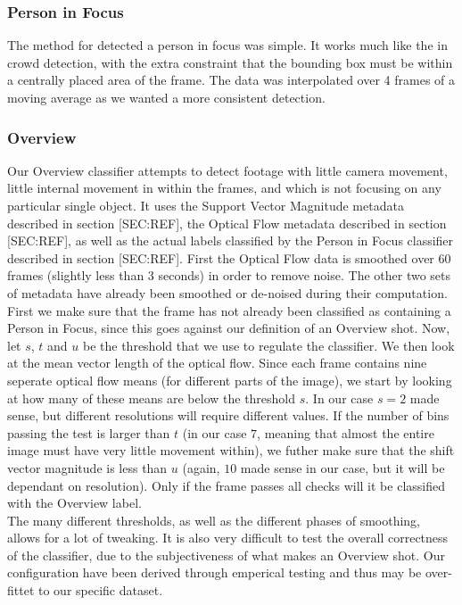 \subsubsection{Person in Focus}
%
The method for detected a person in focus was simple. It works much like the in crowd detection, with the extra constraint that the bounding box must be within a centrally placed area of the frame. The data was interpolated over 4 frames of a moving average as we wanted a more consistent detection.
%
\subsubsection{Overview}
%
Our Overview classifier attempts to detect footage with little camera movement, little internal movement in within the frames, and which is not focusing on any particular single object. It uses the Support Vector Magnitude metadata described in section [SEC:REF], the Optical Flow metadata described in section [SEC:REF], as well as the actual labels classified by the Person in Focus classifier described in section [SEC:REF]. First the Optical Flow data is smoothed over 60 frames (slightly less than 3 seconds) in order to remove noise. The other two sets of metadata have already been smoothed or de-noised during their computation.\\
First we make sure that the frame has not already been classified as containing a Person in Focus, since this goes against our definition of an Overview shot. Now, let $s$, $t$ and $u$ be the threshold that we use to regulate the classifier. We then look at the mean vector length of the optical flow. Since each frame contains nine seperate optical flow means (for different parts of the image), we start by looking at how many of these means are below the threshold $s$. In our case $s=2$ made sense, but different resolutions will require different values. If the number of bins passing the test is larger than $t$ (in our case $7$, meaning that almost the entire image must have very little movement within), we futher make sure that the shift vector magnitude is less than $u$ (again, $10$ made sense in our case, but it will be dependant on resolution). Only if the frame passes all checks will it be classified with the Overview label.\\
The many different thresholds, as well as the different phases of smoothing, allows for a lot of tweaking. It is also very difficult to test the overall correctness of the classifier, due to the subjectiveness of what makes an Overview shot. Our configuration have been derived through emperical testing and thus may be over-fittet to our specific dataset.
%
